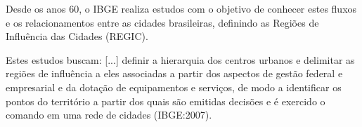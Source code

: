 Desde os anos 60, o IBGE realiza estudos com o objetivo de conhecer estes fluxos e os relacionamentos entre as cidades brasileiras, definindo as Regiões de Influência das Cidades (REGIC).


\begin{block}{Estes estudos buscam:}
[...] definir a hierarquia dos centros urbanos e delimitar as regiões de influência a eles associadas a partir dos aspectos de gestão federal e empresarial e da dotação de equipamentos e serviços, de modo a identificar os pontos do território a partir dos quais são emitidas decisões e é exercido o comando em uma rede de cidades (IBGE:2007).
\end{block}

	

